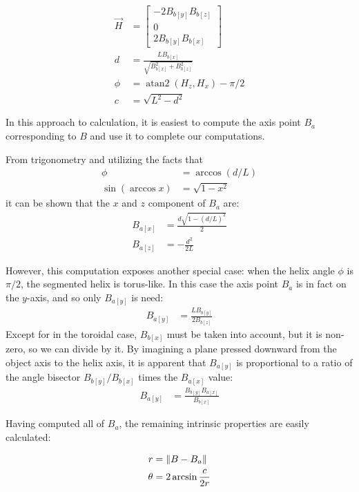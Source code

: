 \documentclass[mathematics,article,submit,pdftex,moreauthors]{Definitions/mdpi}
\DeclareMathOperator{\atantwo}{atan2}
\DeclarePairedDelimiter{\norm}{\lVert}{\rVert}
\begin{document}
\begin{align}
  \overrightarrow{H} &=  \begin{bmatrix} -2 B_{b[y]} B_{b[z]} \\ 0 \\ 2 B_{b[y]} B_{b[x]}  \end{bmatrix} \\
  d &= \frac{L B_{b[x]}}{\sqrt{B_{b[x]}^2 + B_{b[z]}^2}}  \\
  \phi &= \atantwo{(H_z,H_x)} - \pi/2  \\
  c &= \sqrt{L^2 - d^2}
\end{align}

In this approach to calculation, it is easiest
to compute the axis point $B_a$ corresponding to $B$ and
use it to complete our computations.

From trigonometry and utilizing the facts that
\begin{align}
\phi &= \arccos{(d/L)} \\
\sin{(\arccos{x})} &= \sqrt{1 - x^2}
\end{align}
  it
can be shown that
the $x$ and $z$ component of $B_a$ are:
\begin{align}
  B_{a[x]} &= \frac{d\sqrt{1 - (d/L)^2}}{2} \\
  B_{a[z]} &= -\frac{d^2}{2L}
\end{align}

However, this computation exposes another special case: when the
helix angle $\phi$ is $\pi /2$, the segmented helix is
torus-like. In this case the axis point $B_a$ is in fact
on the $y$-axis, and so only $B_{a[y]}$ is need:
\begin{align}
  B_{a[y]} &=  \frac{L B_{b[y]}}{2 B_{b[z]}}
\end{align}
Except for in the toroidal case,  $B_{b[x]}$ must be taken into
account, but it is non-zero, so we can divide by it.
By imagining a plane pressed downward from the
object axis to the helix axis, it is apparent that $B_{a[y]}$
is proportional to a ratio of the angle bisector
$B_{b[y]}/B_{b[x]}$ times the $B_{a[x]}$ value:
\begin{align}
  B_{a[y]} &=  \frac{ B_{b[y]} B_{a[x]}}{ B_{b[x]}}
\end{align}

Having computed all of $B_a$, the remaining intrinsic properties are easily
calculated:

\begin{align}
  r &= \norm{B - B_a}  \\
  \theta &= 2 \arcsin{\frac{c}{2r}}
\end{align}
\end{document}
